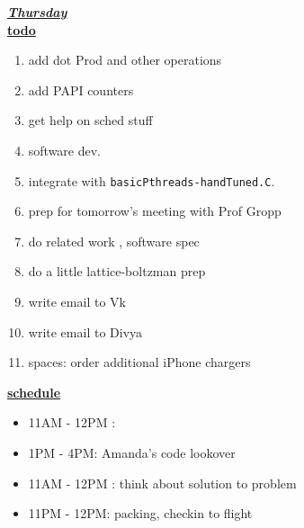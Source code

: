 \underline{\textbf{\textit{Thursday}}}\\
\underline{\textbf{todo}}\\
\begin{enumerate}
\item add dot Prod and other operations   

\item add PAPI counters 
\item get help on sched stuff 
\item software dev. 
\item integrate with \texttt{basicPthreads-handTuned.C}.

\item prep for tomorrow's meeting with Prof Gropp 
\item do related work ,  software spec   

\item do a little lattice-boltzman prep  

\item write email to Vk  
\item write email to Divya  

\item spaces: order additional iPhone chargers  

\end{enumerate}


\underline{\textbf{schedule}}\\
\begin{itemize}

\item 11AM - 12PM :
\item 1PM - 4PM: Amanda's code lookover
\item  11AM - 12PM : think about solution to problem

\item 11PM - 12PM: packing, checkin to flight
\end{itemize}

